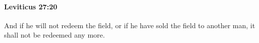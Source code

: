 
		\paragraph{Leviticus 27:20} %
			\label{LEVITICUS-27-20}

			And if he will not redeem the field, or if he have sold the field to another man, it shall not be redeemed any more.


